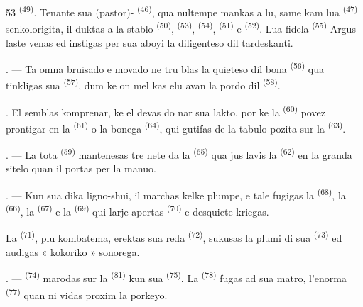 \begin{VUpage}[55]{53}
\VUcontinue
{} \textsuperscript{(49)}. Tenante sua (pastor)- \textsuperscript{(46)}, qua\nl
nultempe mankas a lu, same kam lua  \textsuperscript{(47)}\nl
senkolorigita, il duktas a la stablo \cc
{} \textsuperscript{(50)},  \textsuperscript{(53)},  \textsuperscript{(54)}, \cc
{} \textsuperscript{(51)} e  \textsuperscript{(52)}. Lua fidela  \textsuperscript{(55)}\nl
Argus laste venas ed instigas per sua aboyi la\nl
diligenteso dil tardeskanti.

. --- Ta omna bruisado e movado ne tru\cc
blas la quieteso dil bona  \textsuperscript{(56)}\nl
qua tinkligas sua  \textsuperscript{(57)}, dum ke on mel\cc
kas elu avan la pordo dil  \textsuperscript{(58)}.

. El semblas komprenar, ke el devas do\cc
nar sua lakto, por ke la  \textsuperscript{(60)} povez\nl
prontigar  en la  \textsuperscript{(61)} o la bonega\nl
{} \textsuperscript{(64)}, qui gutifas de la tabulo pozita sur\nl
la  \textsuperscript{(63)}.

. --- La tota  \textsuperscript{(59)} mantenesas tre\nl
nete da la  \textsuperscript{(65)} qua jus lavis la\nl
{} \textsuperscript{(62)} en la granda sitelo quan il portas\nl
per la manuo.

\VUsaut{3.0mm}
\VUsaut{3.0mm}

. --- Kun sua dika ligno-shui, il marchas\nl
kelke plumpe, e tale fugigas la  \textsuperscript{(68)}, la\nl
{} \textsuperscript{(66)}, la  \textsuperscript{(67)} e la  \textsuperscript{(69)} qui\nl
larje apertas  \textsuperscript{(70)} e desquiete kriegas.

\VUblancAlinea
La  \textsuperscript{(71)}, plu kombatema, erektas sua\nl
reda  \textsuperscript{(72)}, sukusas la plumi di sua\nl
{} \textsuperscript{(73)} ed audigas « kokoriko » sonorega.

. ---  \textsuperscript{(74)} marodas sur la\nl
{} \textsuperscript{(81)} kun sua  \textsuperscript{(75)}. La \cc
{} \textsuperscript{(78)} fugas ad sua matro, l'enorma \cc
{} \textsuperscript{(77)} quan ni vidas proxim la porkeyo.
\end{VUpage}

